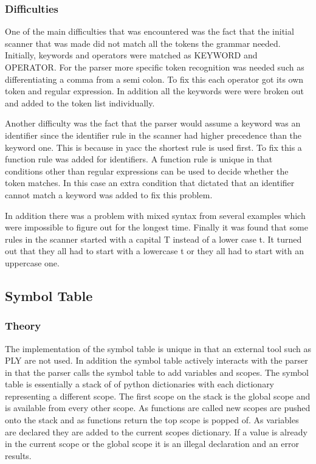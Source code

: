 \documentclass[12pt, oneside]{article}   	%
\begin{document}
\subsubsection{Difficulties}
One of the main difficulties that was encountered was the fact that the initial scanner that was
made did not match all the tokens the grammar needed. Initially, keywords and operators were matched as
KEYWORD and OPERATOR. For the parser more specific token recognition was needed such
as differentiating a comma from a semi colon. To fix this each operator got its own token and regular expression. In addition all the keywords were were broken out and added to the token list individually.

 Another difficulty was the fact that the parser would assume a keyword was an
identifier since the identifier rule in the scanner had higher precedence than the keyword one. This is because in yacc the shortest rule is used first. To fix this a function rule was added for identifiers. A function rule is unique in that conditions other than regular expressions can be used to decide whether the token matches. In this case an extra condition that dictated that an identifier cannot match a keyword was added to fix this problem.

In addition there was a problem with mixed syntax from several examples which were impossible to figure out for the longest time. Finally it was found that some rules in the scanner started with a
capital T instead of a lower case t. It turned out that they all had to start with a lowercase t or they all had to start with an uppercase one.
\subsection{Symbol Table}
\subsubsection{Theory}
The implementation of the symbol table is unique in that an external tool such as PLY are not used. In addition the symbol table actively interacts with the parser in that the parser calls the symbol table to add variables and scopes. The symbol table is essentially a stack of of python dictionaries with each dictionary representing a different scope. The first scope on the stack is the global scope and is available from every other scope. As functions are called new scopes are pushed onto the stack and as functions return the top scope is popped of. As variables are declared they are added to the current scopes dictionary. If a value is already in the current scope or the global scope it is an illegal declaration and an error results.
\end{document}
